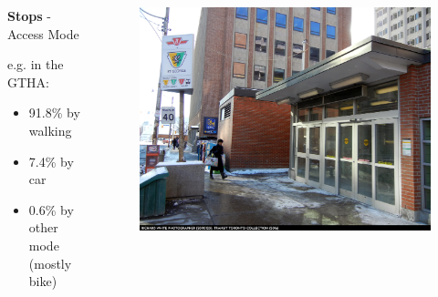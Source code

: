 \documentclass[aspectratio=169]{beamer}
\begin{document}
\begin{frame}
	
	



	\begin{columns}
		\begin{column}{0.5\textwidth}
			\textbf{Stops} - Access Mode
			
			\vspace{2mm}
			
			e.g. in the GTHA: 
			
			\begin{itemize}
				\item 91.8\% by walking
				\item 7.4\% by car
				\item 0.6\% by other mode (mostly bike)
			\end{itemize}
			
			
		\end{column}
		
		\begin{column}{0.5\textwidth}

			\begin{figure}
				\centering
				\includegraphics[width=1\linewidth]{images/st-george.jpg}
			\end{figure}
			
		\end{column}
		
	\end{columns}
		
\end{frame}
\end{document}
